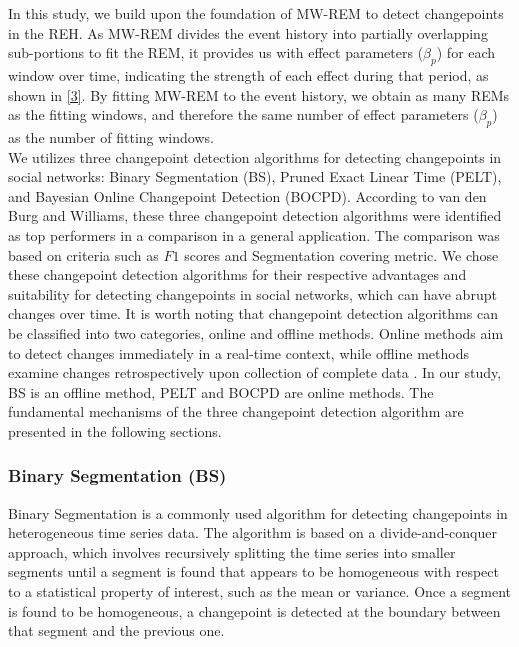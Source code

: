 \documentclass[]{interact}
\theoremstyle{plain}%
\theoremstyle{definition}
\theoremstyle{remark}
\begin{document}
	\hspace{0.2cm} In this study, we build upon the foundation of MW-REM to detect changepoints in the REH. As MW-REM divides the event history into partially overlapping sub-portions to fit the REM, it provides us with effect parameters ($\beta_p$) for each window over time, indicating the strength of each effect during that period, as shown in \autoref{3}. By fitting MW-REM to the event history, we obtain as many REMs as the fitting windows, and therefore the same number of effect parameters ($\beta_p$) as the number of fitting windows. \\
	
	We utilizes three changepoint detection algorithms for detecting changepoints in social networks: Binary Segmentation (BS), Pruned Exact Linear Time (PELT), and Bayesian Online Changepoint Detection (BOCPD). According to van den Burg and Williams\cite{burgEvaluationChangePoint2022}, these three changepoint detection algorithms were identified as top performers in a comparison in a general application. The comparison was based on criteria such as $F1$ scores and Segmentation covering metric. We chose these changepoint detection algorithms for their respective advantages and suitability for detecting changepoints in social networks, which can have abrupt changes over time. It is worth noting that changepoint detection algorithms can be classified into two categories, online and offline methods. Online methods aim to detect changes immediately in a real-time context, while offline methods examine changes retrospectively upon collection of complete data \cite{kendrickChangePointDetection2018}. In our study, BS is an offline method, PELT and BOCPD are online methods. The fundamental mechanisms of the three changepoint detection algorithm are presented in the following sections.
	
	\subsubsection{Binary Segmentation (BS)} \label{sec:BS}
	
	
	\hspace{0.28cm} Binary Segmentation is a commonly used algorithm for detecting changepoints in heterogeneous time series data. The algorithm is based on a divide-and-conquer approach, which involves recursively splitting the time series into smaller segments until a segment is found that appears to be homogeneous with respect to a statistical property of interest, such as the mean or variance. Once a segment is found to be homogeneous, a changepoint is detected at the boundary between that segment and the previous one\cite{killickOptimalDetectionChangepoints2012}. \\
	
\end{document}

